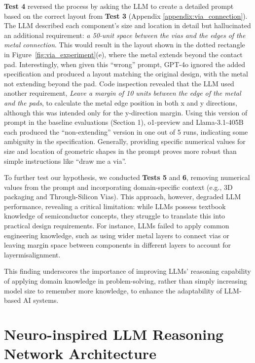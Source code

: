 \documentclass{article}
\begin{document}
\textbf{Test 4} reversed the process by asking the LLM to create a detailed prompt based on the correct layout from \textbf{Test 3} (Appendix \ref{appendix:via_connection}). The LLM described each component's size and location in detail but hallucinated an additional requirement: \textit{a 50-unit space between the vias and the edges of the metal connection}. This would result in the layout shown in the dotted rectangle in Figure~\ref{fig:via_experiment}(e), where the metal extends beyond the contact pad. Interestingly, when given this ``wrong'' prompt, GPT-4o ignored the added specification and produced a layout matching the original design, with the metal not extending beyond the pad. Code inspection revealed that the LLM used another requirement, \textit{Leave a margin of 10 units between the edge of the metal and the pads}, to calculate the metal edge position in both x and y directions, although this was intended only for the y-direction margin. Using this version of prompt in the baseline evaluations (Section 1), o1-preview and Llama-3.1-405B each produced the ``non-extending'' version in one out of 5 runs, indicating some ambiguity in the specification. Generally, providing specific numerical values for size and location of geometric shapes in the prompt proves more robust than simple instructions like ``draw me a via''.

To further test our hypothesis, we conducted \textbf{Tests 5} and \textbf{6}, removing numerical values from the prompt and incorporating domain-specific context (e.g., 3D packaging and Through-Silicon Vias). This approach, however, degraded LLM performance, revealing a critical limitation: while LLMs possess textbook knowledge of semiconductor concepts, they struggle to translate this into practical design requirements. For instance, LLMs failed to apply common engineering knowledge, such as using wider metal layers to connect vias or leaving margin space between components in different layers to account for layermisalignment.

This finding underscores the importance of improving LLMs' reasoning capability of applying domain knowledge in problem-solving, rather than simply increasing model size to remember more knowledge, to enhance the adaptability of LLM-based AI systems.

\section{Neuro-inspired LLM Reasoning Network Architecture}
\end{document}

